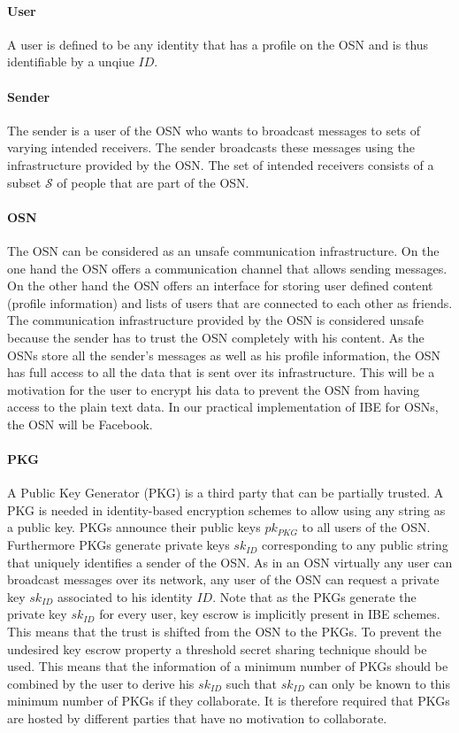 \documentclass[12pt,openany]{article}
\begin{document}
\paragraph{User} A user is defined to be any identity that has a profile on the
OSN and is thus identifiable by a unqiue $ID$.

\paragraph{Sender} The sender is a user of the OSN who wants to broadcast
messages to sets of varying intended receivers. The sender broadcasts these
messages using the infrastructure provided by the OSN. The set of
intended receivers consists of a subset $\mathcal{S}$ of people that are part of
the OSN.

\paragraph{OSN} The OSN can be considered as an unsafe communication
infrastructure. On the one hand the OSN offers a communication channel that
allows sending messages. On the other hand the OSN offers an interface
for storing user defined content (profile information) and lists of users that
are connected to each other as friends. The communication infrastructure
provided by the OSN is considered unsafe because the sender has to trust the OSN
completely with his content. As the OSNs store all the sender's messages
as well as his profile information, the OSN has full access to all the data
that is sent over its infrastructure. This will be a motivation for the user to
encrypt his data to prevent the OSN from having access to the plain text data.
In our practical implementation of IBE for OSNs, the OSN will be Facebook.

\paragraph{PKG} A Public Key Generator (PKG) is a third party that can be
partially trusted. A PKG is needed in identity-based encryption schemes to allow
using any string as a public key. PKGs announce their public keys $pk_{PKG}$
to all users of the OSN. Furthermore PKGs generate private keys $sk_{ID}$
corresponding to any public string that uniquely identifies a sender of the
OSN. As in an OSN virtually any user can broadcast messages over its network,
any user of the OSN can request a private key $sk_{ID}$ associated to his
identity $ID$. Note that as the PKGs generate the private key $sk_{ID}$ for
every user, key escrow is implicitly present in IBE schemes. This means that
the trust is shifted from the OSN to the PKGs. To prevent the undesired key
escrow property a threshold secret sharing technique should be used. This means
that the information of a minimum number of PKGs should be combined by the user
to derive his $sk_{ID}$ such that $sk_{ID}$ can only be known to this minimum
number of PKGs if they collaborate. It is therefore required that PKGs are
hosted by different parties that have no motivation to collaborate.
\end{document}
